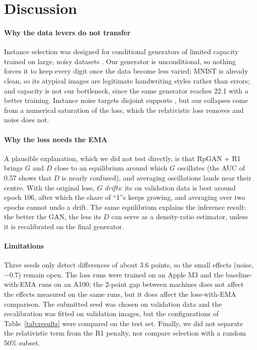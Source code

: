 \section{Discussion}
\label{sec:discussion}
\paragraph{Why the data levers do not transfer}
Instance selection was designed for conditional generators of limited capacity trained on large, noisy datasets \cite{devries2020}. Our generator is unconditional, so nothing forces it to keep every digit once the data become less varied; MNIST is already clean, so its atypical images are legitimate handwriting styles rather than errors; and capacity is not our bottleneck, since the same generator reaches 22.1 with a better training. Instance noise targets disjoint supports \cite{arjovsky2017}, but our collapses come from a numerical saturation of the loss, which the relativistic loss removes and noise does not.

\paragraph{Why the loss needs the EMA}
A plausible explanation, which we did not test directly, is that RpGAN + R1 brings $G$ and $D$ close to an equilibrium around which $G$ oscillates (the AUC of 0.57 shows that $D$ is nearly confused), and averaging oscillations lands near their centre. With the original loss, $G$ \emph{drifts}: its \fcnn{} on validation data is best around epoch 106, after which the share of ``1''s keeps growing, and averaging over two epochs cannot undo a drift. The same equilibrium explains the inference result: the better the GAN, the less its $D$ can serve as a density-ratio estimator, unless it is recalibrated on the final generator.

\paragraph{Limitations}
Three seeds only detect differences of about 3.6 points, so the small effects (noise, $-0.7$) remain open. The loss runs were trained on an Apple M3 and the baseline-with-EMA runs on an A100; the 2-point gap between machines does not affect the effects measured on the same runs, but it does affect the loss-with-EMA comparison. The submitted seed was chosen on validation data and the recalibration was fitted on validation images, but the configurations of Table~\ref{tab:results} were compared on the test set. Finally, we did not separate the relativistic term from the R1 penalty, nor compare selection with a random 50\% subset.
